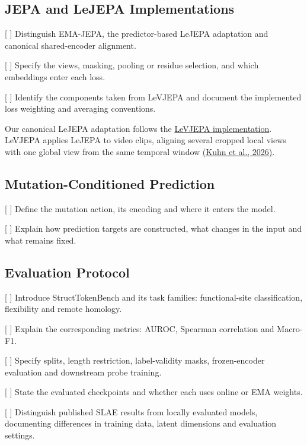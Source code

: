 \subsection{JEPA and LeJEPA Implementations}

[ ] Distinguish EMA-JEPA, the predictor-based LeJEPA adaptation
and canonical shared-encoder alignment.

[ ] Specify the views, masking, pooling or residue selection,
and which embeddings enter each loss.

[ ] Identify the components taken from LeVJEPA and document
the implemented loss weighting and averaging conventions.

Our canonical LeJEPA adaptation follows the \href{https://github.com/MLO-lab/LeVJEPA}{LeVJEPA implementation}.
LeVJEPA applies LeJEPA to video clips, aligning several cropped local views with one global view from the same temporal window \href{https://arxiv.org/abs/2608.27395}{(Kuhn et al., 2026)}.

\subsection{Mutation-Conditioned Prediction}

[ ] Define the mutation action, its encoding and where it
enters the model.

[ ] Explain how prediction targets are constructed,
what changes in the input and what remains fixed.

\subsection{Evaluation Protocol}

[ ] Introduce StructTokenBench and its task families:
functional-site classification, flexibility and remote homology.

[ ] Explain the corresponding metrics: AUROC,
Spearman correlation and Macro-F1.

[ ] Specify splits, length restriction, label-validity masks,
frozen-encoder evaluation and downstream probe training.

[ ] State the evaluated checkpoints and whether each uses
online or EMA weights.

[ ] Distinguish published SLAE results from locally evaluated
models, documenting differences in training data,
latent dimensions and evaluation settings.
